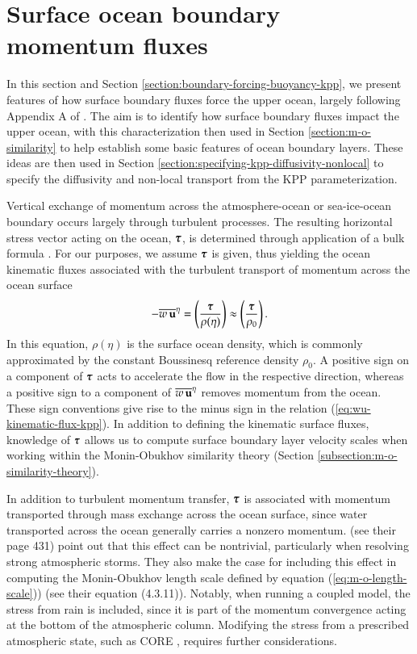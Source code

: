 \section{Surface ocean boundary momentum fluxes}
\label{section:boundary-forcing-momentum-kpp}

In this section and Section
\ref{section:boundary-forcing-buoyancy-kpp}, we present features of
how surface boundary fluxes force the upper ocean, largely following
Appendix A of \cite{LargeKPP}.  The aim is to identify how surface
boundary fluxes impact the upper ocean, with this characterization
then used in Section \ref{section:m-o-similarity} to help establish
some basic features of ocean boundary layers.  These ideas are then
used in Section \ref{section:specifying-kpp-diffusivity-nonlocal} to
specify the diffusivity and non-local transport from the KPP
parameterization.

Vertical exchange of momentum across the atmosphere-ocean or
sea-ice-ocean boundary occurs largely through turbulent processes.
The resulting horizontal stress vector acting on the ocean, $\mbox{\boldmath $\tau$}$,
is determined through application of a bulk formula \citep[e.g., see
Appendix C of][]{CORE}. For our purposes, we assume $\mbox{\boldmath $\tau$}$ is given,
thus yielding the ocean kinematic fluxes associated with the turbulent
transport of momentum across the ocean surface
\begin{equation}
 -\overline{w \, {\bf u}}^{\eta} 
 = \left( \frac{ \mbox{\boldmath $\tau$} }{\rho(\eta)} \right) \approx \left( \frac{ \mbox{\boldmath $\tau$} }{\rho_{0}} \right).
\label{eq:wu-kinematic-flux-kpp}
\end{equation} 
In this equation, $\rho(\eta)$ is the surface ocean density, which is
commonly approximated by the constant Boussinesq reference density
$\rho_{0}$.  A positive sign on a component of $\mbox{\boldmath $\tau$}$ acts to
accelerate the flow in the respective direction, whereas a positive
sign to a component of $\overline{w \, {\bf u}}^{\eta}$ removes
momentum from the ocean.  These sign conventions give rise to the
minus sign in the relation (\ref{eq:wu-kinematic-flux-kpp}).  In
addition to defining the kinematic surface fluxes, knowledge of
$\mbox{\boldmath $\tau$}$ allows us to compute surface boundary layer velocity scales
when working within the Monin-Obukhov similarity theory (Section
\ref{subsection:m-o-similarity-theory}).

In addition to turbulent momentum transfer, $\mbox{\boldmath $\tau$}$ is associated
with momentum transported through mass exchange across the ocean
surface, since water transported across the ocean generally carries a
nonzero momentum.  \cite{KanthaClaysonII} (see their page 431) point
out that this effect can be nontrivial, particularly when resolving
strong atmospheric storms. They also make the case for including this
effect in computing the Monin-Obukhov length scale defined by equation
(\ref{eq:m-o-length-scale})) (see their equation (4.3.11)).  Notably,
when running a coupled model, the stress from rain is included, since
it is part of the momentum convergence acting at the bottom of the
atmospheric column.  Modifying the stress from a prescribed
atmospheric state, such as CORE \citep{LargeYeager2009}, requires
further considerations.


